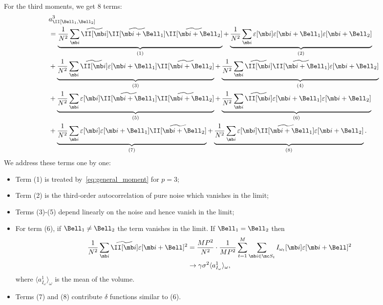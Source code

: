 \documentclass[9pt,twocolumn,twoside,lineno]{pnas-new}
\begin{document}
For the third moments, we get 8 terms:
\[\begin{aligned} 
&a^3_\II[\Bell_1, \Bell_2]  \\&
 = \underbrace{\frac{1}{N^2}\sum_{\mb i}\widetilde\II[\mb i]\widetilde\II[\mb i+\Bell_1]\widetilde\II[\mb i + \Bell_2]}_{(1)} +
\underbrace{\frac{1}{N^2}\sum_{\mb i}\varepsilon[\mb i]\varepsilon[\mb i+\Bell_1]\varepsilon[\mb i + \Bell_2]}_{(2)}\\ 
&+ \underbrace{\frac{1}{N^2}\sum_{\mb i}\widetilde\II[\mb i]\varepsilon[\mb i + \Bell_1]\widetilde\II[\mb i + \Bell_2]}_{(3)} +
\underbrace{\frac{1}{N^2}\sum_{\mb i}\widetilde\II[\mb i]\widetilde\II[\mb i + \Bell_1]\varepsilon[\mb i + \Bell_2]}_{(4)}\\
&+ \underbrace{\frac{1}{N^2}\sum_{\mb i}\varepsilon[\mb i]\widetilde\II[\mb i + \Bell_1]\widetilde\II[\mb i + \Bell_2]}_{(5)} +
\underbrace{\frac{1}{N^2}\sum_{\mb i}\widetilde\II[\mb i]\varepsilon[\mb i + \Bell_1]\varepsilon[\mb i + \Bell_2]}_{(6)}\\
&+ \underbrace{\frac{1}{N^2}\sum_{\mb i}\varepsilon[\mb i]\varepsilon[\mb i + \Bell_1]\widetilde\II[\mb i + \Bell_2]}_{(7)} +
\underbrace{\frac{1}{N^2}\sum_{\mb i}\varepsilon[\mb i]\widetilde\II[\mb i + \Bell_1]\varepsilon[\mb i + \Bell_2]}_{(8)}.
\end{aligned}\]
We address these terms one by one:
\begin{itemize}
	\item  Term (1) is treated by~\eqref{eq:general_moment} for $p=3$;
	\item Term (2) is the third-order autocorrelation of  pure noise  which vanishes in the limit; 
	\item Terms (3)-(5) depend linearly on the noise and hence
	vanish in the limit;
	\item For term (6), if $\Bell_1\neq \Bell_2$ the term
	vanishes in the limit. If $\Bell_1 = \Bell_2$ then
	\[ \begin{aligned}
	\frac{1}{N^2}\sum_{\mb i}\widetilde\II[\mb i]\varepsilon[\mb i + \Bell]^2
	&= \frac{MP^2}{N^2}\cdot\frac{1}{MP^2}\sum_{t=1}^{M}\sum_{\mb i\in\mc S_t}I_{\omega_t}[\mb i]\varepsilon[\mb i + \Bell]^2 
	\\& \to \gamma\sigma^2 \langle a^1_{I_{\omega}}\rangle_{\omega}, %
	\end{aligned}\]
	where $\langle a^1_{I_{\omega}}\rangle_{\omega}$ is the mean of the volume. 
	\item  Terms (7) and (8) contribute $\delta$ functions similar to (6).
\end{itemize}
\end{document}
